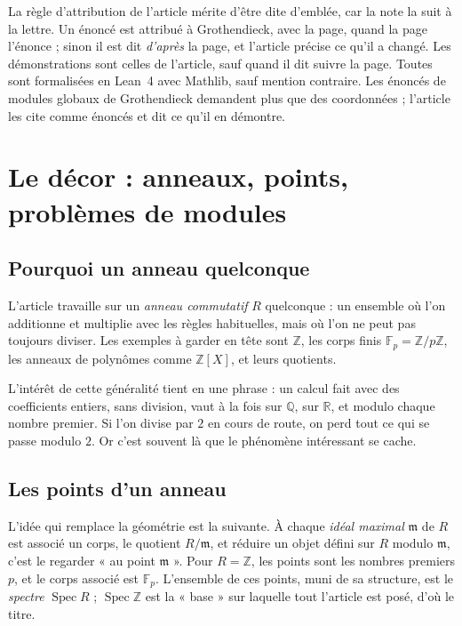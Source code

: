 \documentclass[11pt,a4paper]{amsart}
\theoremstyle{definition}
\theoremstyle{plain}
\theoremstyle{remark}
\theoremstyle{plain}
\newcommand{\Z}{\mathbb Z}
\newcommand{\F}{\mathbb F}
\newcommand{\Q}{\mathbb Q}
\newcommand{\Spec}{\operatorname{Spec}}
\begin{document}
La règle d'attribution de l'article mérite d'être dite d'emblée, car la note la suit à la lettre. Un énoncé est attribué à Grothendieck, avec la page, quand la page l'énonce ; sinon il est dit \emph{d'après} la page, et l'article précise ce qu'il a changé. Les démonstrations sont celles de l'article, sauf quand il dit suivre la page. Toutes sont formalisées en Lean~4 avec Mathlib, sauf mention contraire. Les énoncés de modules globaux de Grothendieck demandent plus que des coordonnées ; l'article les cite comme énoncés et dit ce qu'il en démontre.

\section{Le décor : anneaux, points, problèmes de modules}

\subsection{Pourquoi un anneau quelconque}

L'article travaille sur un \emph{anneau commutatif} $R$ quelconque : un ensemble où l'on additionne et multiplie avec les règles habituelles, mais où l'on ne peut pas toujours diviser. Les exemples à garder en tête sont $\Z$, les corps finis $\F_p = \Z/p\Z$, les anneaux de polynômes comme $\Z[X]$, et leurs quotients.

L'intérêt de cette généralité tient en une phrase : un calcul fait avec des coefficients entiers, sans division, vaut à la fois sur $\Q$, sur $\mathbb R$, et modulo chaque nombre premier. Si l'on divise par $2$ en cours de route, on perd tout ce qui se passe modulo $2$. Or c'est souvent là que le phénomène intéressant se cache.

\subsection{Les points d'un anneau}

L'idée qui remplace la géométrie est la suivante. À chaque \emph{idéal maximal} $\mathfrak m$ de $R$ est associé un corps, le quotient $R/\mathfrak m$, et réduire un objet défini sur $R$ modulo $\mathfrak m$, c'est le regarder « au point $\mathfrak m$ ». Pour $R = \Z$, les points sont les nombres premiers $p$, et le corps associé est $\F_p$. L'ensemble de ces points, muni de sa structure, est le \emph{spectre} $\Spec R$ ; $\Spec\Z$ est la « base » sur laquelle tout l'article est posé, d'où le titre.
\end{document}
